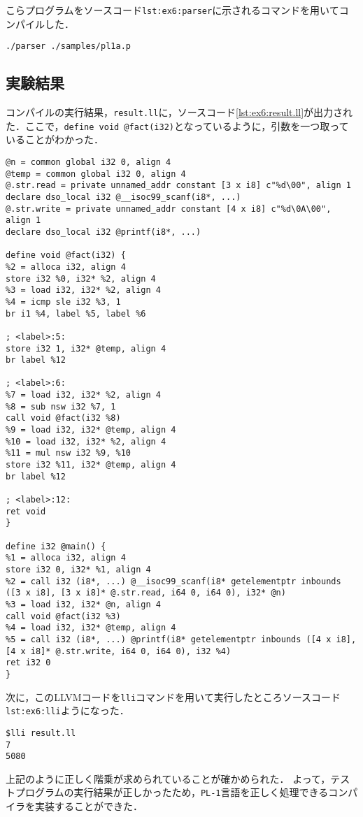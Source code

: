 \documentclass[uplatex]{jsarticle}
\begin{document}
こらプログラムをソースコード\verb#lst:ex6:parser#に示されるコマンドを用いてコンパイルした．
\begin{lstlisting}[caption=parserコマンド,label=lst:ex6:parser]
./parser ./samples/pl1a.p
\end{lstlisting}

\subsection{実験結果}
コンパイルの実行結果，\verb#result.ll#に，ソースコード\ref{lst:ex6:result.ll}が出力された．ここで，\verb#define void @fact(i32)#となっているように，引数を一つ取っていることがわかった．\cite{compiler1}

\begin{lstlisting}[caption=result.ll,label=lst:ex6:result.ll]
@n = common global i32 0, align 4
@temp = common global i32 0, align 4
@.str.read = private unnamed_addr constant [3 x i8] c"%d\00", align 1
declare dso_local i32 @__isoc99_scanf(i8*, ...)
@.str.write = private unnamed_addr constant [4 x i8] c"%d\0A\00", align 1
declare dso_local i32 @printf(i8*, ...)

define void @fact(i32) {
%2 = alloca i32, align 4
store i32 %0, i32* %2, align 4
%3 = load i32, i32* %2, align 4
%4 = icmp sle i32 %3, 1
br i1 %4, label %5, label %6

; <label>:5:
store i32 1, i32* @temp, align 4
br label %12

; <label>:6:
%7 = load i32, i32* %2, align 4
%8 = sub nsw i32 %7, 1
call void @fact(i32 %8)
%9 = load i32, i32* @temp, align 4
%10 = load i32, i32* %2, align 4
%11 = mul nsw i32 %9, %10
store i32 %11, i32* @temp, align 4
br label %12

; <label>:12:
ret void
}

define i32 @main() {
%1 = alloca i32, align 4
store i32 0, i32* %1, align 4
%2 = call i32 (i8*, ...) @__isoc99_scanf(i8* getelementptr inbounds ([3 x i8], [3 x i8]* @.str.read, i64 0, i64 0), i32* @n)
%3 = load i32, i32* @n, align 4
call void @fact(i32 %3)
%4 = load i32, i32* @temp, align 4
%5 = call i32 (i8*, ...) @printf(i8* getelementptr inbounds ([4 x i8], [4 x i8]* @.str.write, i64 0, i64 0), i32 %4)
ret i32 0
}
\end{lstlisting}

次に，このLLVMコードを\verb#lli#コマンドを用いて実行したところソースコード\verb#lst:ex6:lli#ようになった．

\begin{lstlisting}[caption=parserコマンド,label=lst:ex4:lli]
$lli result.ll
7
5080
\end{lstlisting}
上記のように正しく階乗が求められていることが確かめられた．
よって，テストプログラムの実行結果が正しかったため，\verb#PL-1#言語を正しく処理できるコンパイラを実装することができた．
\end{document}

